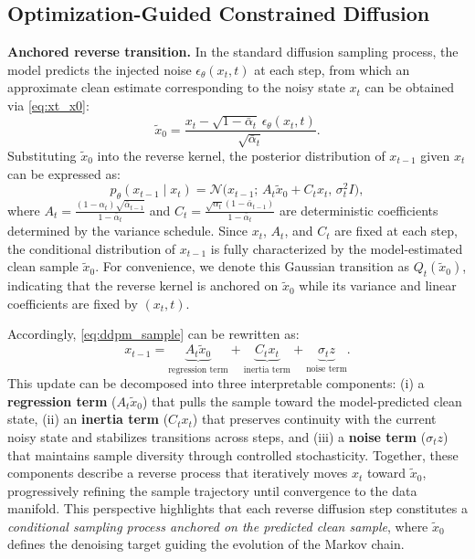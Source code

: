 \documentclass[10pt,twocolumn,letterpaper]{article}
\theoremstyle{plain}
\theoremstyle{remark}
\renewcommand{\paragraph}[1]{\vspace{.5em}\noindent\textbf{#1.}}
\begin{document}
\subsection{Optimization-Guided Constrained Diffusion}
\label{sec:omega}

\vspace{2pt}
\paragraph{Anchored reverse transition}
In the standard diffusion sampling process, the model predicts the injected noise $\epsilon_\theta(x_t, t)$ at each step, from which an approximate clean estimate corresponding to the noisy state \(x_t\) can be obtained via \cref{eq:xt_x0}:
\begin{equation}
\tilde{x}_0 = \frac{x_t - \sqrt{1-\bar{\alpha}_t}\,\epsilon_\theta(x_t, t)}{\sqrt{\bar{\alpha}_t}}.
\label{eq:x0_estimate}
\end{equation}
Substituting $\tilde{x}_0$ into the reverse kernel, the posterior distribution of $x_{t-1}$ given $x_t$ can be expressed as:
\begin{equation}
p_\theta(x_{t-1} \mid x_t)
= \mathcal{N}\!\big(x_{t-1};\, A_t \tilde{x}_0 + C_t x_t,\, \sigma_t^2 I\big),
\label{eq:reverse_kernel}
\end{equation}
where $A_t = \frac{(1 - \alpha_t)\sqrt{\bar{\alpha}_{t-1}}}{1 - \bar{\alpha}_t}$ and 
$C_t = \frac{\sqrt{\alpha_t}(1 - \bar{\alpha}_{t-1})}{1 - \bar{\alpha}_t}$ 
are deterministic coefficients determined by the variance schedule.  
Since $x_t$, $A_t$, and $C_t$ are fixed at each step, the conditional distribution of $x_{t-1}$ is fully characterized by the model-estimated clean sample $\tilde{x}_0$.  
For convenience, we denote this Gaussian transition as \( Q_t(\tilde{x}_0) \),  
indicating that the reverse kernel is anchored on $\tilde{x}_0$ while its variance and linear coefficients are fixed by $(x_t, t)$.

Accordingly, \cref{eq:ddpm_sample} can be rewritten as:
\begin{equation}
x_{t-1}
= \underbrace{A_t \tilde{x}_0}_{\text{regression term}}
+ \underbrace{C_t x_t}_{\text{inertia term}}
+ \underbrace{\sigma_t z}_{\text{noise term}}.
\end{equation}
This update can be decomposed into three interpretable components:
(i) a \textbf{regression term} ($A_t \tilde{x}_0$) that pulls the sample toward the model-predicted clean state,
(ii) an \textbf{inertia term} ($C_t x_t$) that preserves continuity with the current noisy state and stabilizes transitions across steps,
and (iii) a \textbf{noise term} ($\sigma_t z$) that maintains sample diversity through controlled stochasticity.
Together, these components describe a reverse process that iteratively moves $x_t$ toward $\tilde{x}_0$, progressively refining the sample trajectory until convergence to the data manifold.
This perspective highlights that each reverse diffusion step constitutes a \textit{conditional sampling process anchored on the predicted clean sample}, where $\tilde{x}_0$ defines the denoising target guiding the evolution of the Markov chain.
\end{document}
